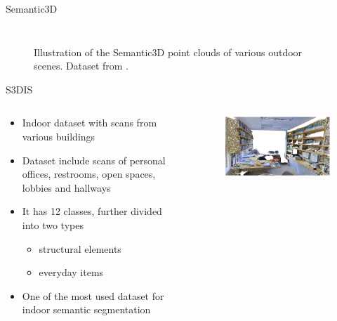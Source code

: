\documentclass[aspectratio=169]{beamer}
\begin{document}
\begin{frame}{Semantic3D}
\begin{columns}
\begin{column}{0.33\textwidth}
\begin{figure}
            \end{figure}
        \end{column}
    \end{columns}
    \begin{figure}
        \centering
        \caption{Illustration of the Semantic3D point clouds of various outdoor scenes. Dataset from \cite{hackel2017semantic3d}.}
    \end{figure}
\end{frame}
\begin{frame}{S3DIS}
    \begin{columns}
        \begin{column}{0.6\textwidth}
            \begin{itemize}
                \item Indoor dataset with scans from various buildings
                \item Dataset include scans of personal offices, restrooms, open spaces, lobbies and hallways
                \item It has 12 classes, further divided into two types
                \begin{itemize}
                    \item structural elements 
                    \item everyday items
                \end{itemize}
                \item One of the most used dataset for indoor semantic segmentation
            \end{itemize}
        \end{column}
        \begin{column}{0.4\textwidth}
            \begin{figure}
                \centering
                \includegraphics[scale=0.35]{images/s3dis/s3dis_sample_1.jpg}

\end{figure}
\end{column}
\end{columns}
\end{frame}
\end{document}
